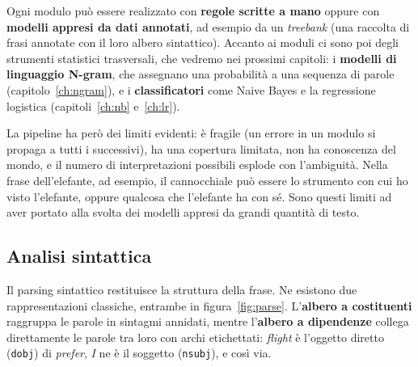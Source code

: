 Ogni modulo può essere realizzato con \textbf{regole scritte a mano} oppure con \textbf{modelli appresi da dati annotati}, ad esempio da un \textit{treebank} (una raccolta di frasi annotate con il loro albero sintattico). Accanto ai moduli ci sono poi degli strumenti statistici trasversali, che vedremo nei prossimi capitoli: i \textbf{modelli di linguaggio N-gram}, che assegnano una probabilità a una sequenza di parole (capitolo~\ref{ch:ngram}), e i \textbf{classificatori} come Naive Bayes e la regressione logistica (capitoli~\ref{ch:nb} e~\ref{ch:lr}).

La pipeline ha però dei limiti evidenti: è fragile (un errore in un modulo si propaga a tutti i successivi), ha una copertura limitata, non ha conoscenza del mondo, e il numero di interpretazioni possibili esplode con l'ambiguità. Nella frase dell'elefante, ad esempio, il cannocchiale può essere lo strumento con cui ho visto l'elefante, oppure qualcosa che l'elefante ha con sé. Sono questi limiti ad aver portato alla svolta dei modelli appresi da grandi quantità di testo.

\subsection{Analisi sintattica}
Il parsing sintattico restituisce la struttura della frase. Ne esistono due rappresentazioni classiche, entrambe in figura~\ref{fig:parse}. L'\textbf{albero a costituenti} raggruppa le parole in sintagmi annidati, mentre l'\textbf{albero a dipendenze} collega direttamente le parole tra loro con archi etichettati: \textit{flight} è l'oggetto diretto (\texttt{dobj}) di \textit{prefer}, \textit{I} ne è il soggetto (\texttt{nsubj}), e così via.

